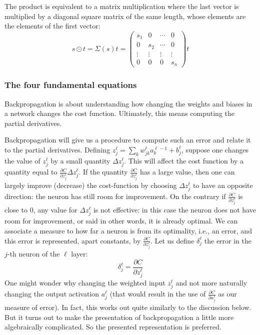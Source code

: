 The product is equivalent to a matrix multiplication where the last vector is multiplied by a diagonal square matrix of the same length, whose elements are the elements of the first vector:
\begin{equation}
s\odot t = \Sigma(s) t = \begin{pmatrix} s_1 &0 &\cdots & 0 \\0 & s_2 & \cdots &0 \\
\vdots & \vdots &\vdots & \vdots\\
0  & 0 &0 &s_n
\end{pmatrix}t
\end{equation}

\subsubsection{The four fundamental equations}
Backpropagation is about understanding how changing the weights and biases in a network changes the cost function. Ultimately, this means computing the partial derivatives.

Backpropagation will give us a procedure to compute such an error and relate it to the partial derivatives. Defining $z_j^\ell = \sum_k w_{jk}^\ell a_k^{\ell-1} + b_j^\ell$, suppose one changes the value of $z_j^\ell$ by a small quantity $\Delta z_j^\ell$. This will affect the cost function by a quantity equal to $\frac{\partial C}{\partial z_j^\ell}\Delta z_j^\ell$. If the quantity $\frac{\partial C}{\partial z_j^\ell}$ has a large value, then one can largely improve (decrease) the cost-function by choosing $\Delta z_j^\ell$ to have an opposite direction: the neuron has still room for improvement. On the contrary if $\frac{\partial C}{\partial z_j^\ell}$ is close to $0$, any value for $\Delta z_j^\ell$ is not effective: in this case the neuron does not have room for improvement, or said in other words, it is already optimal. We can associate a measure to how far a neuron is from its optimality, i.e., an error, and this error is represented, apart constants, by $\frac{\partial C}{\partial z_j^\ell}$. Let us define $\delta_j^\ell$ the error in the $j$-th neuron of the $\ell$ layer:
\begin{equation}
\delta_j^\ell =\frac{\partial C}{\partial z_j^\ell}
\end{equation}
One might wonder why changing the weighted input $z_j^\ell$ and not more naturally changing the output activation $a^\ell_j$ (that would result in the use of $\frac{\partial C}{\partial a^\ell_j}$ as our measure of error). In fact, this works out quite similarly to the discussion below. But it turns out to make the presentation of backpropagation a little more algebraically complicated. So the presented representation is preferred.

